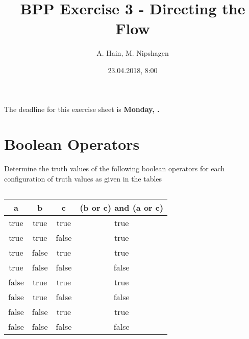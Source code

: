 


\title{BPP Exercise 3 - Directing the Flow}
\author{A. Hain, M. Nipshagen}
\date{23.04.2018, 8:00}

\makeatletter
\let\thetitle\@title
\let\theauthor\@author
\let\thedate\@date
\makeatother

\pagestyle{fancy}
\fancyhf{}
\fancyhead[L]{\thetitle}
\fancyhead[C]{}
\fancyhead[R]{\theauthor}
\renewcommand{\headrulewidth}{0.4pt} %
\fancyfoot[L]{Due: \thedate}
\fancyfoot[R]{\thepage} %
\renewcommand{\footrulewidth}{0.4pt}

\renewcommand\sol[1]{#1}



The deadline for this exercise sheet is \textbf{Monday, \thedate.}
%
%
\section{Boolean Operators}
Determine the truth values of the following boolean operators for each configuration
of truth values as given in the tables

\subsection{}
\begin{tabular}{| c | c | c | c |}
  \hline
  \textbf{a} & \textbf{b} & \textbf{c} & \textbf{(b or c) and (a or c)} \\
  \hline
  true & true & true & \sol{true} \\
  \hline
  true & true & false & \sol{true} \\
  \hline
  true & false & true & \sol{true} \\
  \hline
  true & false & false & \sol{false} \\
  \hline
  false & true & true & \sol{true} \\
  \hline
  false & true & false & \sol{false} \\
  \hline
  false & false & true & \sol{true} \\
  \hline
  false & false & false & \sol{false} \\
  \hline
\end{tabular}

